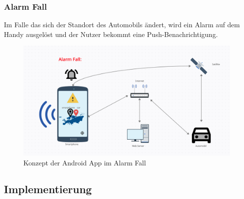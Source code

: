 \subsubsection{Alarm Fall} 
Im Falle das sich der Standort des Automobils ändert, wird ein Alarm auf dem Handy ausgelöst und der Nutzer bekommt eine Push-Benachrichtigung.
     \begin{figure}[H]
            \centering
            \includegraphics[width=1\textwidth]{Bilder/AlarmFall.PNG}
            \caption{Konzept der Android App im Alarm Fall}
            \label{standardfall}
	
    \end{figure}
	
\subsection{Implementierung}
